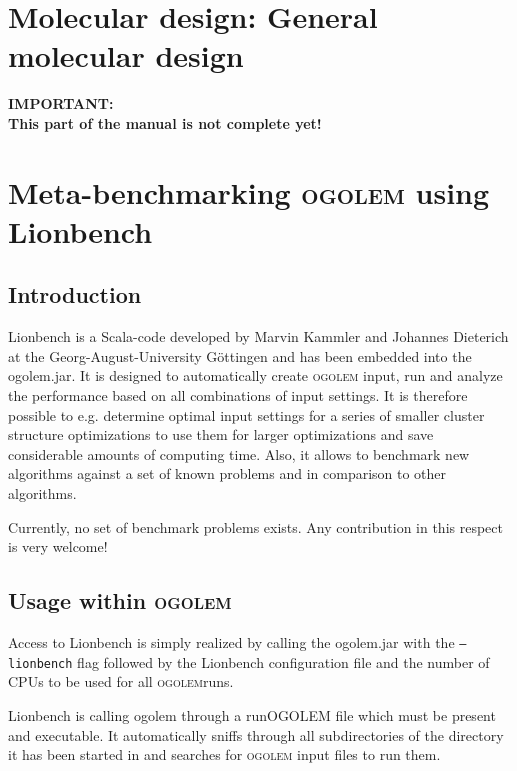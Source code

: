 \documentclass[a4paper,10pt]{scrbook}
\newcommand{\ogo}{\textsc{ogolem}}
\begin{document}
\chapter{Molecular design: General molecular design}
\textbf{IMPORTANT:\\
This part of the manual is not complete yet!}

\chapter{Meta-benchmarking \textsc{ogolem} using Lionbench}
\section{Introduction}
Lionbench is a Scala-code developed by Marvin Kammler and Johannes Dieterich at 
the Georg-August-University G\"ottingen and has been embedded into the 
ogolem.jar. It is designed to automatically create \textsc{ogolem} input, run 
and analyze the performance based on all combinations of input settings. It is 
therefore possible to e.g. determine optimal input settings for a series of 
smaller cluster structure optimizations to use them for larger optimizations 
and save considerable amounts of computing time. Also, it allows to benchmark 
new algorithms against a set of known problems and in comparison to other 
algorithms.

Currently, no set of benchmark problems exists. Any contribution in this 
respect is very welcome!

\section{Usage within \textsc{ogolem}}
Access to Lionbench is simply realized by calling the ogolem.jar with the 
\texttt{--lionbench} flag followed by the Lionbench configuration file and the 
number of CPUs to be used for all \ogo runs.

Lionbench is calling ogolem through a runOGOLEM file which must be present and 
executable. It automatically sniffs through all subdirectories of the directory 
it has been started in and searches for \ogo{} input files to run them.
\end{document}

